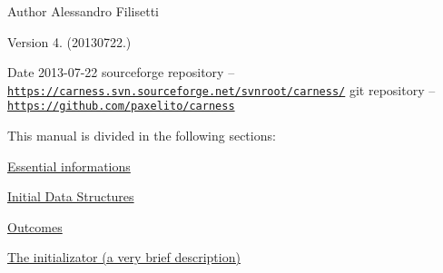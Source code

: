 \begin{DoxyAuthor}{Author}
Alessandro Filisetti 
\end{DoxyAuthor}
\begin{DoxyVersion}{Version}
4. (20130722.) 
\end{DoxyVersion}
\begin{DoxyDate}{Date}
2013-\/07-\/22 sourceforge repository -- \href{https://carness.svn.sourceforge.net/svnroot/carness/}{\tt https\-://carness.\-svn.\-sourceforge.\-net/svnroot/carness/} git repository -- \href{https://github.com/paxelito/carness}{\tt https\-://github.\-com/paxelito/carness}
\end{DoxyDate}
This manual is divided in the following sections\-:
\begin{DoxyItemize}
\item \hyperlink{intro}{Essential informations}
\item \hyperlink{pageInitStr}{Initial Data Structures}
\item \hyperlink{pageoutcomes}{Outcomes}
\item \hyperlink{pageInitializator}{The initializator (a very brief description)} 
\end{DoxyItemize}